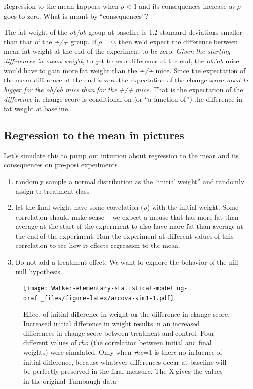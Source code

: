 \documentclass[]{book}
\providecommand{\tightlist}{%
  \setlength{\itemsep}{0pt}\setlength{\parskip}{0pt}}
\begin{document}
Regression to the mean happens when \(\rho < 1\) and its consequences
increase as \(\rho\) goes to zero. What is meant by ``consequences''?

The fat weight of the \emph{ob/ob} group at baseline is 1.2 standard
deviations smaller than that of the \emph{+/+} group. If \(\rho=0\),
then we'd expect the difference between mean fat weight at the end of
the experiment to be zero. \emph{Given the starting differences in mean
weight}, to get to zero difference at the end, the \emph{ob/ob} mice
would have to gain more fat weight than the \emph{+/+} mice. Since the
expectation of the mean difference at the end is zero the expectation of
the change score \emph{must be bigger for the ob/ob mice than for the
+/+ mice}. That is the expectation of the \emph{difference} in change
score is conditional on (or ``a function of'') the difference in fat
weight at baseline.

\subsection{Regression to the mean in
pictures}\label{regression-to-the-mean-in-pictures}

Let's simulate this to pump our intuition about regression to the mean
and its consequences on pre-post experiments.

\begin{enumerate}
\def\labelenumi{\arabic{enumi}.}
\tightlist
\item
  randomly sample a normal distribution as the ``initial weight'' and
  randomly assign to treatment class
\item
  let the final weight have some correlation (\(\rho\)) with the initial
  weight. Some correlation should make sense -- we expect a mouse that
  has more fat than average at the start of the experiment to also have
  more fat than average at the end of the experiment. Run the experiment
  at different values of this correlation to see how it effects
  regression to the mean.
\item
  Do not add a treatment effect. We want to explore the behavior of the
  nill null hypothesis.
\end{enumerate}

\begin{figure}
\centering
\texttt{[image: Walker-elementary-statistical-modeling-draft\_files/figure-latex/ancova-sim1-1.pdf]}
\caption{\label{fig:ancova-sim1}Effect of initial difference in weight on
the difference in change score. Increased initial difference in weight
results in an increased differences in change score between treatment
and control. Four different values of \emph{rho} (the correlation
between initial and final weights) were simulated. Only when
\emph{rho}=1 is there no influence of initial difference, because
whatever differences occur at baseline will be perfectly preserved in
the final measure. The X gives the values in the original Turnbaugh
data}
\end{figure}
\end{document}
